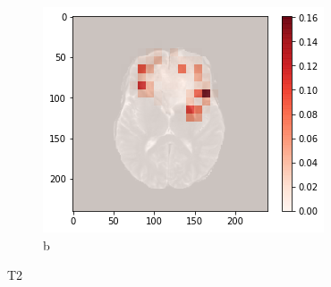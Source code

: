 \begin{figure}[H]
        \begin{subfigure}{.33\textwidth}
        \centering
        \includegraphics[width=\linewidth]{chapters/07_brats3d/images/11_t2_hdm.png}
        \caption{b}
    \end{subfigure}
    \caption{T2}
\end{figure}

